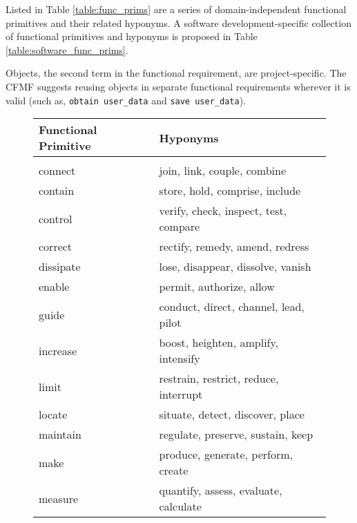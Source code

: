 \documentclass[letterpaper,10pt]{article}
\begin{document}
                Listed in Table \ref{table:func_prims} are a series of
                domain-independent functional primitives and their
                related hyponyms. A software development-specific
                collection of functional primitives and hyponyms is
                proposed in Table \ref{table:software_func_prims}.

                Objects, the second term in the functional
                requirement, are project-specific. The CFMF suggests
                reusing objects in separate functional requirements
                wherever it is valid (such as, \texttt{obtain
                  user\_data} and \texttt{save user\_data}).

				\begin{figure}[ht]
                \begin{center}
                    \begin{tabular}{l|l}
                      Functional Primitive & Hyponyms\\
                      \hline\\
                      connect     & join, link, couple, combine\\
                      contain     & store, hold, comprise, include\\
                      control     & verify, check, inspect, test, compare\\
                      correct     & rectify, remedy, amend, redress\\
                      dissipate   & lose, disappear, dissolve, vanish\\
                      enable      & permit, authorize, allow\\
                      guide       & conduct, direct, channel, lead, pilot\\
                      increase    & boost, heighten, amplify, intensify\\
                      limit       & restrain, restrict, reduce, interrupt\\
                      locate      & situate, detect, discover, place\\
                      maintain    & regulate, preserve, sustain, keep\\
                      make        & produce, generate, perform, create\\
                      measure     & quantify, assess, evaluate, calculate\\

\end{tabular}
\end{center}
\end{figure}
\end{document}
